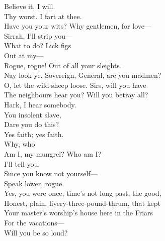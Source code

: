 \documentclass[a4paper,oneside,12pt]{memoir}
\begin{document}
\begin{drama*}

\item \xspace

\act

\scene

\facespeaks Believe it, I will.\\
\subtlespeaks {} Thy worst. I fart at thee.\\
\dolspeaks Have you your wits? Why gentlemen, for love---\\
\facespeaks Sirrah, I'll strip you---\\
\subtlespeaks {} What to do? Lick figs\\
Out at my---\\
\facespeaks {} Rogue, rogue! Out of all your sleights.\\
\dolspeaks Nay look ye, Sovereign, General, are you madmen?\\
\subtlespeaks O, let the wild sheep loose.
\dolspeaks {} Sirs, will you have\\
The neighbours hear you? Will you betray all?\\
Hark, I hear somebody.\\
\facespeaks {} You insolent slave,\\
Dare you do this?\\
\subtlespeaks {} Yes faith; yes faith.\\
\facespeaks {} Why, who\\
Am I, my mungrel? Who am I?\\
\subtlespeaks {} I'll tell you,\\
Since you know not yourself---\\
\facespeaks {} Speak lower, rogue.\\
\subtlespeaks Yes, you were once, time's not long past, the good,\\
Honest, plain, livery-three-pound-thrum, that kept\\
Your master's worship's house here in the Friars\\
For the vacations---\\
\facespeaks {} Will you be so loud?\\

\end{drama*}
\end{document}
